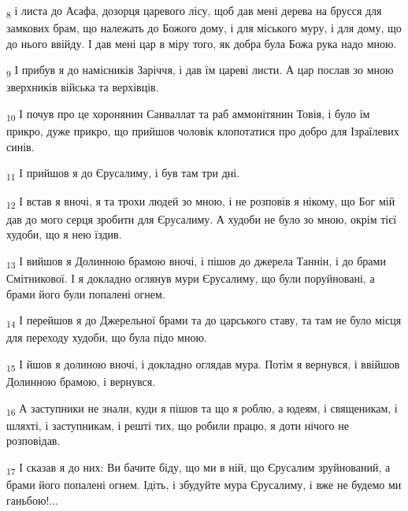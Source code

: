 \begin{tcolorbox}
\textsubscript{8} і листа до Асафа, дозорця царевого лісу, щоб дав мені дерева на брусся для замкових брам, що належать до Божого дому, і для міського муру, і для дому, що до нього ввійду. І дав мені цар в міру того, як добра була Божа рука надо мною.
\end{tcolorbox}
\begin{tcolorbox}
\textsubscript{9} І прибув я до намісників Заріччя, і дав їм цареві листи. А цар послав зо мною зверхників війська та верхівців.
\end{tcolorbox}
\begin{tcolorbox}
\textsubscript{10} І почув про це хоронянин Санваллат та раб аммонітянин Товія, і було їм прикро, дуже прикро, що прийшов чоловік клопотатися про добро для Ізраїлевих синів.
\end{tcolorbox}
\begin{tcolorbox}
\textsubscript{11} І прийшов я до Єрусалиму, і був там три дні.
\end{tcolorbox}
\begin{tcolorbox}
\textsubscript{12} І встав я вночі, я та трохи людей зо мною, і не розповів я нікому, що Бог мій дав до мого серця зробити для Єрусалиму. А худоби не було зо мною, окрім тієї худоби, що я нею їздив.
\end{tcolorbox}
\begin{tcolorbox}
\textsubscript{13} І вийшов я Долинною брамою вночі, і пішов до джерела Таннін, і до брами Смітникової. І я докладно оглянув мури Єрусалиму, що були поруйновані, а брами його були попалені огнем.
\end{tcolorbox}
\begin{tcolorbox}
\textsubscript{14} І перейшов я до Джерельної брами та до царського ставу, та там не було місця для переходу худоби, що була підо мною.
\end{tcolorbox}
\begin{tcolorbox}
\textsubscript{15} І йшов я долиною вночі, і докладно оглядав мура. Потім я вернувся, і ввійшов Долинною брамою, і вернувся.
\end{tcolorbox}
\begin{tcolorbox}
\textsubscript{16} А заступники не знали, куди я пішов та що я роблю, а юдеям, і священикам, і шляхті, і заступникам, і решті тих, що робили працю, я доти нічого не розповідав.
\end{tcolorbox}
\begin{tcolorbox}
\textsubscript{17} І сказав я до них: Ви бачите біду, що ми в ній, що Єрусалим зруйнований, а брами його попалені огнем. Ідіть, і збудуйте мура Єрусалиму, і вже не будемо ми ганьбою!...
\end{tcolorbox}
